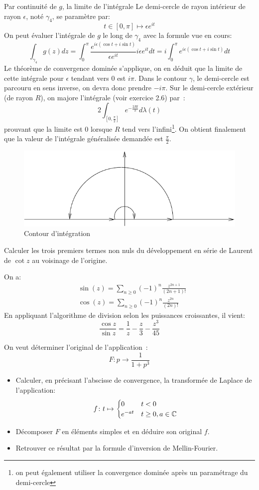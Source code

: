 \documentclass[a4paper, 12pt]{amsart}
\begin{document}
Par continuité
de $g$, la  limite de l'intégrale
Le demi-cercle de rayon intérieur de rayon $\epsilon$, noté $\gamma_4$, se paramètre par:
\[
t \in [0,\pi] \mapsto \epsilon e^{it}
\]
On peut évaluer l'intégrale de $g$ le long de $\gamma_4$ avec la formule vue en cours:
\[
\int_{\gamma_4}^{} g(z) dz = \int_0^\pi \frac{e^{i\epsilon(\cos t + i \sin t)}}{\epsilon e^{it}}i \epsilon e^{it}dt = i \int_0^\pi e^{i\epsilon(\cos t + i \sin t)} dt
\]
Le théorème de convergence dominée s'applique, on en déduit que la limite de cette intégrale pour $\epsilon$ tendant vers 0 est $i \pi$. Dans le contour $\gamma$, le demi-cercle est parcouru en sens inverse, on devra donc prendre $-i \pi$. 
Sur le
demi-cercle extérieur (de rayon $R$), on majore l'intégrale (voir exercice 2.6) par~:
\[
2 \int_{[0, \frac{\pi}{2}]} e^{- \frac{2 R t}{\pi}} d\lambda(t)
\]
prouvant que la limite est $0$ lorsque $R$ tend vers l'infini\footnote{on peut également utiliser la convergence dominée après un 
paramétrage du demi-cercle}.
 On obtient finalement que la valeur de
l'intégrale généralisée demandée est $\frac{\pi}{2}$.
\begin{figure}[ht]
\includegraphics[scale=1]{images/contour_sinc.pdf}
\caption{Contour d'intégration}\label{fig:contour_sinc}
\end{figure} 
\begin{fex} 
    Calculer les trois premiers termes non nuls du développement en série de Laurent de $\cot z$ au voisinage de l'origine.
\end{fex} 
On a:
\[
\begin{split}
    & \sin(z) = \sum_{n\geq 0} (-1)^n \frac{z^{2n+1}}{(2n+1)!} \\
     & \cos(z) = \sum_{n\geq 0} (-1)^n \frac{z^{2n}}{(2n)!}
\end{split}
\]
En appliquant l'algorithme de division selon les puissances croissantes, il vient:
\[
\frac{\cos z}{\sin z} = \frac{1}{z} - \frac{z}{3} - \frac{z^3}{45}
\]
\begin{fex} 
On veut déterminer l'original de l'application~:
\[
F : p \to \frac{1}{1+p^3}
\]
\begin{itemize} 
\item Calculer, en précisant l'abscisse de convergence, la transformée de Laplace de l'application:
\[
f \colon t \mapsto \begin{cases}
    0 & t< 0 \\
    e^{-at} & t \geq 0, a \in \mathbb{C}
\end{cases}
\]
\item Décomposer $F$ en éléments simples et en déduire son original $f.$
\item Retrouver ce résultat par la formule d'inversion de Mellin-Fourier.
\end{itemize} 
\end{fex} 
\end{document}
